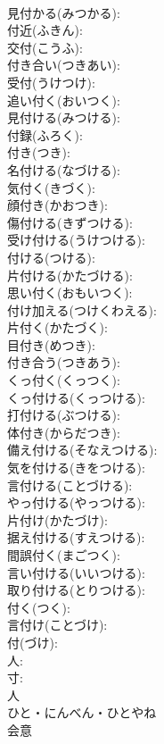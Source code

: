 \documentclass[8pt]{extreport}
\begin{document}
\begin{CJK}{UTF8}{min}
\\	見付かる(みつかる): 
\\	付近(ふきん): 
\\	交付(こうふ): 
\\	付き合い(つきあい): 
\\	受付(うけつけ): 
\\	追い付く(おいつく): 
\\	見付ける(みつける): 
\\	付録(ふろく): 
\\	付き(つき): 
\\	名付ける(なづける): 
\\	気付く(きづく): 
\\	顔付き(かおつき): 
\\	傷付ける(きずつける): 
\\	受け付ける(うけつける): 
\\	付ける(つける): 
\\	片付ける(かたづける): 
\\	思い付く(おもいつく): 
\\	付け加える(つけくわえる): 
\\	片付く(かたづく): 
\\	目付き(めつき): 
\\	付き合う(つきあう): 
\\	くっ付く(くっつく): 
\\	くっ付ける(くっつける): 
\\	打付ける(ぶつける): 
\\	体付き(からだつき): 
\\	備え付ける(そなえつける): 
\\	気を付ける(きをつける): 
\\	言付ける(ことづける): 
\\	やっ付ける(やっつける): 
\\	片付け(かたづけ): 
\\	据え付ける(すえつける): 
\\	間誤付く(まごつく): 
\\	言い付ける(いいつける): 
\\	取り付ける(とりつける): 
\\	付く(つく): 
\\	言付け(ことづけ): 
\\	付(づけ): 
\\	人: 
\\	寸: 
\\	人	
\\	ひと・にんべん・ひとやね	
\\	会意 

\end{CJK}
\end{document}

